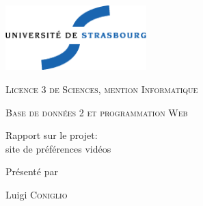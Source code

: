 \thispagestyle{empty}

\begin{center}
       \noindent
       \includegraphics[height=2.5cm]{./pics/uds.eps}       
       
       \vfill\vfill

    {\large \textsc{Licence 3 de Sciences, mention Informatique}}

    \bigskip\bigskip

    {\large \textsc{Base de données 2 et programmation Web}}

    \vfill\vfill

    {\huge \sc
      \begin{center}
        Rapport sur le projet: \\
        site de préférences vidéos
      \end{center}}

    \vfill\vfill

    {\large Présenté par}

\medskip

    {\large Luigi  \textsc{Coniglio}}\\
\bigskip

\end{center}
